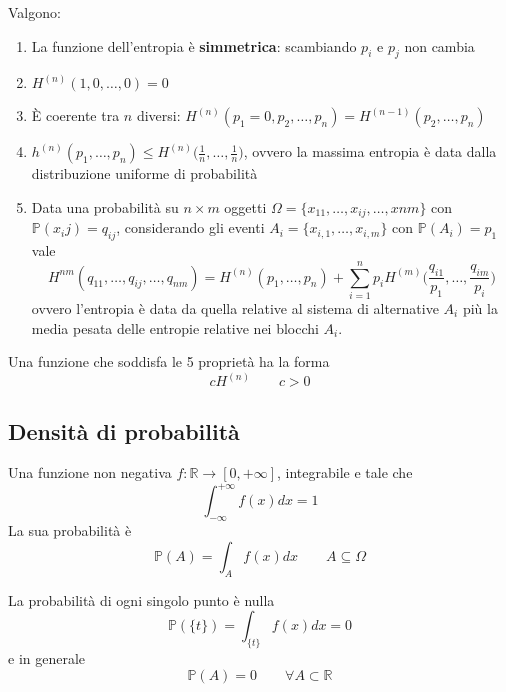 \begin{proposition}
	Valgono:
	\begin{enumerate}
		\item La funzione dell'entropia è \textbf{simmetrica}: scambiando $p_i$ e $p_j$ non cambia
		\item $H^{(n)}(1, 0,\ldots, 0) =0$
		\item È coerente tra $n$ diversi: $H^{(n)}(p_1=0, p_2, \ldots, p_n) = H^{(n-1)}(p_2, \ldots, p_n)$
		\item $h^{(n)}(p_1, \ldots, p_n) \leq H^{(n)}\big(\frac{1}{n}, \ldots, \frac{1}{n}\big)$, ovvero la massima entropia è data dalla distribuzione uniforme di probabilità
		\item Data una probabilità su $n \times m$ oggetti $\Omega = \{x_{11}, \ldots, x_{ij}, \ldots, x{nm}\}$ con $\mathbb{P}({x_ij})=q_{ij}$, considerando gli eventi $A_i = \{x_{i,1}, \ldots, x_{i,m}\}$ con $\mathbb{P}(A_i)=p_1$ vale
		\begin{equation*}
			H^{nm}(q_{11}, \ldots, q_{ij}, \ldots, q_{nm}) = H^{(n)}(p_1, \ldots, p_n) + \sum_{i=1}^{n}p_i H^{(m)}\bigg(\frac{q_{i1}}{p_1}, \ldots, \frac{q_{im}}{p_i}\bigg)
		\end{equation*}
		ovvero l'entropia è data da quella relative al sistema di alternative $A_i$ più la media pesata delle entropie relative nei blocchi $A_i$.
	\end{enumerate}
\end{proposition}

\begin{theorem}[Shannon]
	Una funzione che soddisfa le 5 proprietà ha la forma
	\begin{equation}
		cH^{(n)} \quad\quad c>0
	\end{equation}
\end{theorem}

\subsection{Densità di probabilità}
\begin{definition}
	Una funzione non negativa $f: \mathbb{R} \to [0, + \infty]$, integrabile e tale che 
	\begin{equation*}
		\int_{-\infty}^{+\infty}f(x)dx = 1
	\end{equation*}
	La sua probabilità è 
	\begin{equation}
		\mathbb{P}(A) = \int_{A}f(x)dx \quad\quad A \subseteq \Omega
	\end{equation}
\end{definition}

\begin{observation}
	La probabilità di ogni singolo punto è nulla
	\begin{equation}
		\mathbb{P}(\{t\})=\int_{\{t\}}f(x)dx=0
	\end{equation} e in generale
	\begin{equation}
		\mathbb{P}(A) = 0 \quad\quad \forall A \subset \mathbb{R}
	\end{equation}
\end{observation}